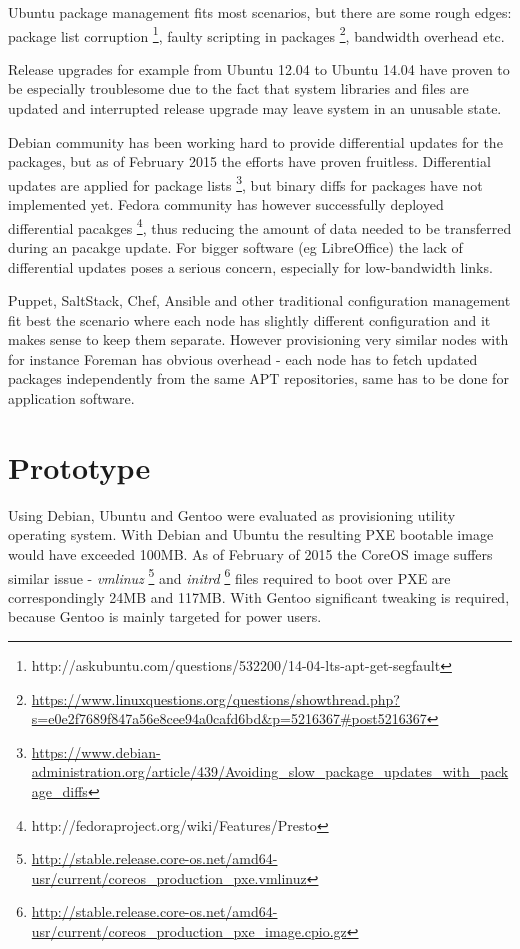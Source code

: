 \documentclass{article}
\begin{document}
Ubuntu package management fits most scenarios, but there are some rough edges:
package list corruption
\footnote{http://askubuntu.com/questions/532200/14-04-lts-apt-get-segfault},
faulty scripting in packages
\footnote{\url{https://www.linuxquestions.org/questions/showthread.php?s=e0e2f7689f847a56e8cee94a0cafd6bd&p=5216367#post5216367}},
bandwidth overhead etc.

Release upgrades for example from Ubuntu 12.04 to Ubuntu 14.04
have proven to be especially troublesome due to the fact that system libraries
and files are updated and interrupted release upgrade may leave system
in an unusable state.

Debian community has been working hard to provide differential updates for
the packages, but as of February 2015 the efforts have proven fruitless.
Differential updates are applied for package lists
\footnote{\url{https://www.debian-administration.org/article/439/Avoiding_slow_package_updates_with_package_diffs}},
but binary diffs for packages have not implemented yet.
Fedora community has however successfully deployed differential pacakges
\footnote{http://fedoraproject.org/wiki/Features/Presto},
thus reducing the amount of data needed to be transferred during an pacakge update. For bigger software (eg LibreOffice) the lack of differential updates poses a serious concern, especially for low-bandwidth links.

Puppet, SaltStack, Chef, Ansible and other traditional configuration management
fit best the scenario where each node has slightly different configuration and
it makes sense to keep them separate. However provisioning very similar nodes
with for instance Foreman has obvious overhead - each node has to fetch updated
packages independently from the same APT repositories, same has to be done for
application software.

\section{Prototype}

Using Debian, Ubuntu and Gentoo were evaluated as provisioning utility
operating system. With Debian and Ubuntu the resulting PXE bootable image
would have exceeded 100MB.
As of February of 2015 the CoreOS image suffers similar issue -
\emph{vmlinuz}
\footnote{\url{http://stable.release.core-os.net/amd64-usr/current/coreos_production_pxe.vmlinuz}}
and
\emph{initrd}
\footnote{\url{http://stable.release.core-os.net/amd64-usr/current/coreos_production_pxe_image.cpio.gz}}
files required to boot over PXE are correspondingly 24MB and 117MB.
With Gentoo significant tweaking is required, because Gentoo is
mainly targeted for power users.
\end{document}
